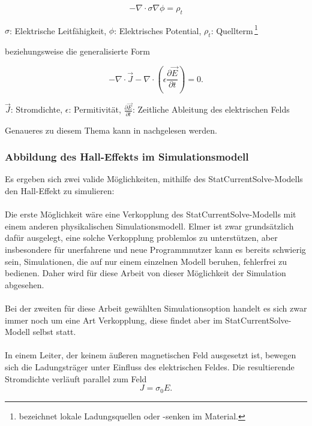 \documentclass[12pt, a4paper]{article}
\renewcommand{\footnotesize}{\fontsize{10pt}{12pt}\selectfont}
\begin{document}
\begin{equation}
	-\nabla\cdot\sigma\nabla\phi=\rho_t
	\tag{4.7}
	\label{4.7}
\end{equation}

\vspace{-0.8em}
\begin{center}
	\footnotesize
	$\sigma$: Elektrische Leitfähigkeit, $\phi$: Elektrisches Potential, $\rho_t$: Quellterm\,\footnote{bezeichnet lokale Ladungsquellen oder -senken im Material.}
\end{center}

{\raggedright
beziehungsweise die generalisierte Form}

\begin{equation}
	-\nabla\cdot\vec{J}-\nabla\cdot(\epsilon\frac{\partial\vec{E}}{\partial{t}})=0.
	\tag{4.8}
	\label{4.8}
\end{equation}

\vspace{-0.8em}
\begin{center}
	\footnotesize
	$\vec{J}$: Stromdichte, $\epsilon$: Permitivität, $\frac{\partial\vec{E}}{\partial{t}}$: Zeitliche Ableitung des elektrischen Felds
\end{center}

{\raggedright
Genaueres zu diesem Thema kann in \cite{elmerModel} nachgelesen werden.}

\subsubsection{Abbildung des Hall-Effekts im Simulationsmodell}
Es ergeben sich zwei valide Möglichkeiten, mithilfe des StatCurrentSolve-Modells den Hall-Effekt zu simulieren:\paragraph{}
Die erste Möglichkeit wäre eine Verkopplung des StatCurrentSolve-Modells mit einem anderen physikalischen Simulationsmodell. Elmer ist zwar grundsätzlich dafür ausgelegt, eine solche Verkopplung problemlos zu unterstützen, aber insbesondere für unerfahrene und neue Programmnutzer kann es bereits schwierig sein, Simulationen, die auf nur einem einzelnen Modell beruhen, fehlerfrei zu bedienen. Daher wird für diese Arbeit von dieser Möglichkeit der Simulation abgesehen.\paragraph{}
Bei der zweiten für diese Arbeit gewählten Simulationsoption handelt es sich zwar immer noch um eine Art Verkopplung, diese findet aber im StatCurrentSolve-Modell selbst statt.\paragraph{}
In einem Leiter, der keinem äußeren magnetischen Feld ausgesetzt ist, bewegen sich die Ladungsträger unter Einfluss des elektrischen Feldes. Die resultierende Stromdichte verläuft parallel zum Feld
\begin{equation}
	J=\sigma_0E.
	\tag{4.9}
	\label{4.9}
\end{equation}
\end{document}
